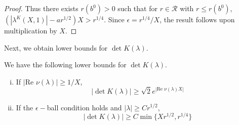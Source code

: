 \documentclass[thesis.tex]{subfiles}
\begin{document}
\begin{lemma:epsilonballlemma}
\begin{proof}
Thus there exists $r(b^0) > 0$ such that for $r \in \mathcal{R}$ with $r \leq r(b^0)$, $(|\lambda^K(X,1)| - a r^{1/2})X > r^{1/4}$. Since $\epsilon = r^{1/4}/X$, the result follows upon multiplication by $X$.
\end{proof}
\end{lemma:epsilonballlemma}

Next, we obtain lower bounds for $\det K(\lambda)$. 

\begin{lemma}\label{detKlemma}
We have the following lower bounds for $\det K(\lambda)$.
\begin{enumerate}[(i)]
\item If $|\text{Re }\nu(\lambda)| \geq 1/X$, 
\begin{equation}\label{detKbound1}
|\det K(\lambda)| \geq \sqrt{2} e^{|\text{Re }\nu(\lambda)X|}
\end{equation}
\item If the $\epsilon-$ball condition holds and $|\lambda| \geq C r^{1/2}$,
\begin{equation}\label{detKbound2}
|\det K(\lambda)|\geq C \min\{ X r^{1/2}, r^{1/4} \}
\end{equation}
\end{enumerate}


\end{lemma}
\end{document}
